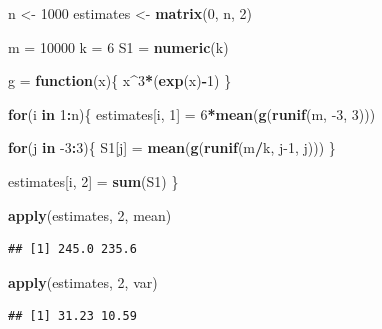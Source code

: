 \documentclass[
]{article}
\newenvironment{Shaded}{\begin{snugshade}}{\end{snugshade}}
\newcommand{\ControlFlowTok}[1]{\textcolor[rgb]{0.13,0.29,0.53}{\textbf{#1}}}
\newcommand{\DecValTok}[1]{\textcolor[rgb]{0.00,0.00,0.81}{#1}}
\newcommand{\KeywordTok}[1]{\textcolor[rgb]{0.13,0.29,0.53}{\textbf{#1}}}
\newcommand{\NormalTok}[1]{#1}
\newcommand{\OperatorTok}[1]{\textcolor[rgb]{0.81,0.36,0.00}{\textbf{#1}}}
\newcommand{\StringTok}[1]{\textcolor[rgb]{0.31,0.60,0.02}{#1}}
\begin{document}
\begin{Shaded}
\begin{Highlighting}[]
\NormalTok{n <-}\StringTok{ }\DecValTok{1000}
\NormalTok{estimates <-}\StringTok{ }\KeywordTok{matrix}\NormalTok{(}\DecValTok{0}\NormalTok{, n, }\DecValTok{2}\NormalTok{)}

\NormalTok{m =}\StringTok{ }\DecValTok{10000}
\NormalTok{k =}\StringTok{ }\DecValTok{6}
\NormalTok{S1 =}\StringTok{ }\KeywordTok{numeric}\NormalTok{(k)}

\NormalTok{g =}\StringTok{ }\ControlFlowTok{function}\NormalTok{(x)\{}
\NormalTok{  x}\OperatorTok{^}\DecValTok{3}\OperatorTok{*}\NormalTok{(}\KeywordTok{exp}\NormalTok{(x)}\OperatorTok{-}\DecValTok{1}\NormalTok{)}
\NormalTok{\}}

\ControlFlowTok{for}\NormalTok{(i }\ControlFlowTok{in} \DecValTok{1}\OperatorTok{:}\NormalTok{n)\{}
\NormalTok{  estimates[i, }\DecValTok{1}\NormalTok{] =}\StringTok{ }\DecValTok{6}\OperatorTok{*}\KeywordTok{mean}\NormalTok{(}\KeywordTok{g}\NormalTok{(}\KeywordTok{runif}\NormalTok{(m, }\DecValTok{-3}\NormalTok{, }\DecValTok{3}\NormalTok{)))}
  
  \ControlFlowTok{for}\NormalTok{(j }\ControlFlowTok{in} \DecValTok{-3}\OperatorTok{:}\DecValTok{3}\NormalTok{)\{}
\NormalTok{  S1[j] =}\StringTok{ }\KeywordTok{mean}\NormalTok{(}\KeywordTok{g}\NormalTok{(}\KeywordTok{runif}\NormalTok{(m}\OperatorTok{/}\NormalTok{k, j}\DecValTok{-1}\NormalTok{, j)))}
\NormalTok{  \}}
  
\NormalTok{  estimates[i, }\DecValTok{2}\NormalTok{] =}\StringTok{ }\KeywordTok{sum}\NormalTok{(S1)}
\NormalTok{\}}


\KeywordTok{apply}\NormalTok{(estimates, }\DecValTok{2}\NormalTok{, mean)}
\end{Highlighting}
\end{Shaded}

\begin{verbatim}
## [1] 245.0 235.6
\end{verbatim}

\begin{Shaded}
\begin{Highlighting}[]
\KeywordTok{apply}\NormalTok{(estimates, }\DecValTok{2}\NormalTok{, var)}
\end{Highlighting}
\end{Shaded}

\begin{verbatim}
## [1] 31.23 10.59
\end{verbatim}
\end{document}
